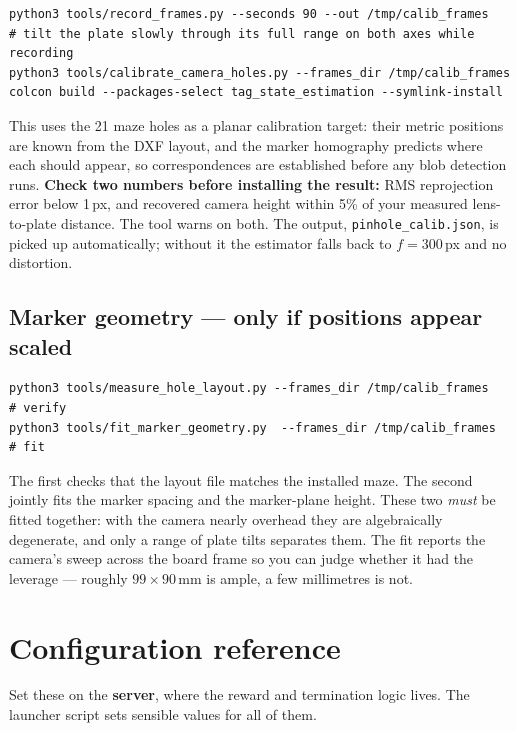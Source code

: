 \documentclass[11pt,a4paper]{article}
\newcommand{\file}[1]{\texttt{\small #1}}
\begin{document}
\begin{lstlisting}
python3 tools/record_frames.py --seconds 90 --out /tmp/calib_frames
# tilt the plate slowly through its full range on both axes while recording
python3 tools/calibrate_camera_holes.py --frames_dir /tmp/calib_frames
colcon build --packages-select tag_state_estimation --symlink-install
\end{lstlisting}

This uses the 21 maze holes as a planar calibration target: their metric
positions are known from the DXF layout, and the marker homography predicts where
each should appear, so correspondences are established before any blob detection
runs. \textbf{Check two numbers before installing the result:} RMS reprojection
error below 1\,px, and recovered camera height within 5\% of your measured
lens-to-plate distance. The tool warns on both. The output,
\file{pinhole\_calib.json}, is picked up automatically; without it the estimator
falls back to $f = 300$\,px and no distortion.

\subsection{Marker geometry --- only if positions appear scaled}

\begin{lstlisting}
python3 tools/measure_hole_layout.py --frames_dir /tmp/calib_frames   # verify
python3 tools/fit_marker_geometry.py  --frames_dir /tmp/calib_frames  # fit
\end{lstlisting}

The first checks that the layout file matches the installed maze. The second
jointly fits the marker spacing and the marker-plane height. These two
\emph{must} be fitted together: with the camera nearly overhead they are
algebraically degenerate, and only a range of plate tilts separates them. The fit
reports the camera's sweep across the board frame so you can judge whether it had
the leverage --- roughly $99\times90$\,mm is ample, a few millimetres is not.

\section{Configuration reference}

Set these on the \textbf{server}, where the reward and termination logic lives.
The launcher script sets sensible values for all of them.
\end{document}
